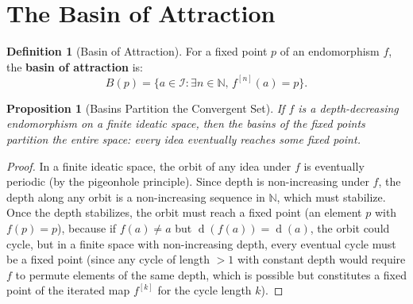 \documentclass[11pt,openany]{book}
\theoremstyle{definition}
\newtheorem{definition}[axiom]{Definition}
\theoremstyle{plain}
\newtheorem{proposition}[axiom]{Proposition}
\theoremstyle{remark}
\newcommand{\IS}{\mathcal{I}}               %
\newcommand{\depth}{\operatorname{d}}       %
\begin{document}
\section{The Basin of Attraction}

\begin{definition}[Basin of Attraction]
For a fixed point $p$ of an endomorphism $f$, the \textbf{basin of attraction} is:
\[
B(p) = \{a \in \IS : \exists n \in \mathbb{N}, \, f^{[n]}(a) = p\}.
\]
\end{definition}

\begin{proposition}[Basins Partition the Convergent Set]
If $f$ is a depth-decreasing endomorphism on a finite ideatic space, then the basins of the fixed points partition the entire space: every idea eventually reaches some fixed point.
\end{proposition}

\begin{proof}
In a finite ideatic space, the orbit of any idea under $f$ is eventually periodic (by the pigeonhole principle). Since depth is non-increasing under $f$, the depth along any orbit is a non-increasing sequence in $\mathbb{N}$, which must stabilize. Once the depth stabilizes, the orbit must reach a fixed point (an element $p$ with $f(p) = p$), because if $f(a) \neq a$ but $\depth(f(a)) = \depth(a)$, the orbit could cycle, but in a finite space with non-increasing depth, every eventual cycle must be a fixed point (since any cycle of length $> 1$ with constant depth would require $f$ to permute elements of the same depth, which is possible but constitutes a fixed point of the iterated map $f^{[k]}$ for the cycle length $k$).
\end{proof}
\end{document}
